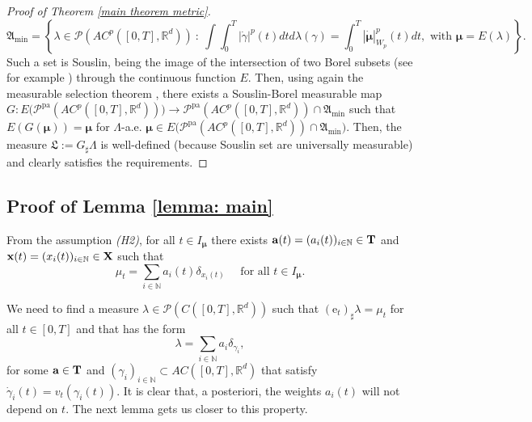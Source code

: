 \documentclass[10pt,leqno]{amsart}
\numberwithin{equation}{section}
\newcommand{\R}{\mathbb{R}}
\newcommand{\N}{\mathbb{N}}
\newcommand{\PP}{\mathcal{P}}
\newcommand{\PPpa}{\PP^{\operatorname{pa}}}
\newcommand{\e}{\mathrm{e}}
\begin{document}
\begin{proof}[Proof of Theorem \ref{main theorem metric}]
    \[\mathfrak{A}_{\min} = \left\{ \lambda \in \PP(AC^p([0,T],\R^d)) \ : \ \int \int_0^T |\dot\gamma|^p(t)dt d\lambda(\gamma) = \int_0^T |\dot{\boldsymbol{\mu}}|_{W_p}^p(t)dt, \text{ with }{\boldsymbol{\mu}} = E(\lambda) \right\}.\]
    Such a set is Souslin, being the image of the intersection of two Borel subsets (see for example \cite[Appendix D]{pinzisavare2025}) through the continuous function $E$. Then, using again the measurable selection theorem \cite[Theorem 6.9.1]{bogachev2007measure}, there exists a Souslin-Borel measurable map $G: E\big( \PPpa(AC^p([0,T],\R^d)) \big) \to\PPpa(AC^p([0,T],\R^d))\cap \mathfrak{A}_{\min}$ such that $E(G(\boldsymbol{\mu})) = \boldsymbol{\mu}$ for $\Lambda$-a.e. $\boldsymbol\mu \in E\big( \PPpa(AC^p([0,T],\R^d)) \cap \mathfrak{A}_{\min} \big)$. Then, the measure $\mathfrak{L}:= G_\sharp \Lambda$ is well-defined (because Souslin set are universally measurable) and clearly satisfies the requirements.
\end{proof}




\subsection{Proof of Lemma \ref{lemma: main}}\label{subsec: proof}


From the assumption \textit{(H2)}, for all $t\in I_{\boldsymbol{\mu}}$ there exists $\bold{a}(t) = (a_i(t))_{i\in \N} \in \bold{T}$ and $\bold{x}(t) = (x_i(t))_{i\in \N} \in \bold{X}$ such that 
    \begin{equation}
        \mu_t = \sum_{i\in \N} a_i(t) \delta_{x_i(t)} \quad \text{ for all }t \in I_{\boldsymbol{\mu}}.
    \end{equation}

We need to find a measure $\lambda \in \PP(C([0,T],\R^d))$ such that $(\e_t)_\sharp\lambda = \mu_t$ for all $t\in[0,T]$ and that has the form 
\begin{equation}
    \lambda = \sum_{i\in \N} a_i \delta_{\gamma_i},
\end{equation}
for some $\bold{a} \in \bold{T}$ and $(\gamma_i)_{i\in\N} \subset AC([0,T],\R^d)$ that satisfy $\dot{\gamma}_i(t) = v_t(\gamma_i(t))$. It is clear that, a posteriori, the weights $a_i(t)$ will not depend on $t$. The next lemma gets us closer to this property.
\end{document}
